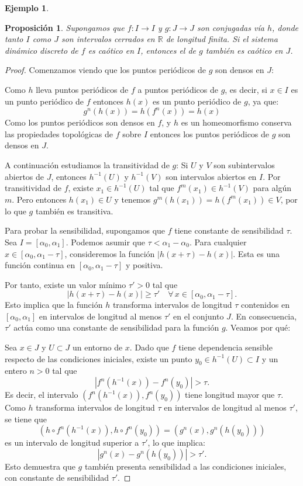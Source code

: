 \documentclass[12pt,a4paper]{report}
\newtheorem{proposicion}{Proposición}[section]
\theoremstyle{definition}
\newtheorem{ejemplo}{Ejemplo}[section]
\begin{document}
\begin{ejemplo}
\begin{proposicion}\label{Prop5}
Supongamos que $f: I \to I$ y $g: J \to J$ son conjugadas vía $h$, donde tanto $I$ como $J$ son intervalos cerrados en $\mathbb{R}$ de longitud finita. Si el sistema dinámico discreto de $f$ es caótico en $I$, entonces el de $g$ también es caótico en $J$.
\end{proposicion}

\begin{proof}
Comenzamos viendo que los puntos periódicos de $g$ son densos en $J$:

Como $h$ lleva puntos periódicos de $f$ a puntos periódicos de $g$, es decir, si $x \in I$ es un punto periódico de $f$ entonces $h(x)$ es un punto periódico de $g$, ya que:
\[
g^n(h(x)) = h(f^n(x)) = h(x)
\]
%
Como los puntos periódicos son densos en $f$, y $h$ es un homeomorfismo conserva las propiedades topológicas de $f$ sobre $I$ entonces los puntos periódicos de $g$ son densos en $J$.

A continuación estudiamos la transitividad de $g$:
Si $U$ y $V$ son subintervalos abiertos de $J$, entonces $h^{-1}(U)$ y $h^{-1}(V)$ son intervalos abiertos en $I$. Por transitividad de $f$, existe $x_1 \in h^{-1}(U)$ tal que $f^m(x_1) \in h^{-1}(V)$ para algún $m$. Pero entonces $h(x_1) \in U$ y tenemos $g^m(h(x_1)) = h(f^m(x_1)) \in V$, por lo que $g$ también es transitiva.

Para probar la sensibilidad, supongamos que $f$ tiene constante de sensibilidad $\tau$. Sea $I = [\alpha_0, \alpha_1]$. Podemos asumir que $\tau < \alpha_1 - \alpha_0$. Para cualquier $x \in [\alpha_0, \alpha_1 - \tau]$, consideremos la función $|h(x+\tau) - h(x)|$. Esta es una función continua en $[\alpha_0, \alpha_1 - \tau]$ y positiva.

Por tanto, existe un valor mínimo \( \tau' > 0 \) tal que
\[
|h(x+\tau) - h(x)| \geq \tau' \quad \forall \, x \in [\alpha_0, \alpha_1 - \tau].
\]
Esto implica que la función \( h \) transforma intervalos de longitud \( \tau \) contenidos en \( [\alpha_0, \alpha_1] \) en intervalos de longitud al menos \( \tau' \) en el conjunto \( J \). En consecuencia, \( \tau' \) actúa como una constante de sensibilidad para la función \( g \). Veamos por qué:

Sea \( x \in J \) y \( U \subset J \) un entorno de \( x \). Dado que \( f \) tiene dependencia sensible respecto de las condiciones iniciales, existe un punto \( y_0 \in h^{-1}(U) \subset I \) y un entero \( n > 0 \) tal que
\[
\left| f^{n}(h^{-1}(x)) - f^{n}(y_0) \right| > \tau.
\]
Es decir, el intervalo \( (f^{n}(h^{-1}(x)), f^{n}(y_0)) \) tiene longitud mayor que \( \tau \). Como \( h \) transforma intervalos de longitud \( \tau \) en intervalos de longitud al menos \( \tau' \), se tiene que
\[
(h \circ f^{n}(h^{-1}(x)), h \circ f^{n}(y_0)) = (g^{n}(x), g^{n}(h(y_0)))
\]
es un intervalo de longitud superior a \( \tau' \), lo que implica:
\[
|g^{n}(x) - g^{n}(h(y_0))| > \tau'.
\]
Esto demuestra que \( g \) también presenta sensibilidad a las condiciones iniciales, con constante de sensibilidad \( \tau' \).

\end{proof}

\end{ejemplo}
\end{document}
